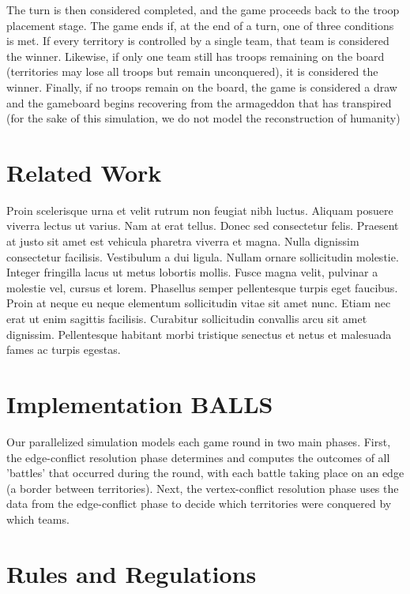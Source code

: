 \documentclass[10pt]{article}
\begin{document}
\begin{multicols}{2}
		The turn is then considered completed, and the game proceeds back to the troop placement stage.
		The game ends if, at the end of a turn, one of three conditions is met. 
		If every territory is controlled by a single team, that team is considered the winner. 
		Likewise, if only one team still has troops remaining on the board (territories may lose all troops but remain unconquered), it is considered the winner.
		Finally, if no troops remain on the board, the game is considered a draw and the gameboard begins recovering from the armageddon that has transpired (for the sake of this simulation, we do not model the reconstruction of humanity)

		\section*{Related Work}
		Proin scelerisque urna et velit rutrum non feugiat nibh luctus. Aliquam posuere viverra lectus ut varius. Nam at erat tellus. Donec sed consectetur felis. Praesent at justo sit amet est vehicula pharetra viverra et magna. Nulla dignissim consectetur facilisis. Vestibulum a dui ligula. Nullam ornare sollicitudin molestie. Integer fringilla lacus ut metus lobortis mollis. Fusce magna velit, pulvinar a molestie vel, cursus et lorem. Phasellus semper pellentesque turpis eget faucibus. Proin at neque eu neque elementum sollicitudin vitae sit amet nunc. Etiam nec erat ut enim sagittis facilisis. Curabitur sollicitudin convallis arcu sit amet dignissim. Pellentesque habitant morbi tristique senectus et netus et malesuada fames ac turpis egestas.

		\section*{Implementation BALLS}
		Our parallelized simulation models each game round in two main phases. 
		First, the edge-conflict resolution phase determines and computes the outcomes of all 'battles' that occurred during the round, with each battle taking place on an edge (a border between territories). 
		Next, the vertex-conflict resolution phase uses the data from the edge-conflict phase to decide which territories were conquered by which teams. 
		
		\section*{Rules and Regulations}
		


\end{multicols}
\end{document}
